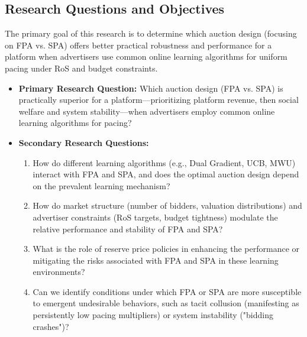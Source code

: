 \documentclass[12pt, a4paper]{article}
\begin{document}
\subsection{Research Questions and Objectives}
The primary goal of this research is to determine which auction design (focusing on FPA vs. SPA) offers better practical robustness and performance for a platform when advertisers use common online learning algorithms for uniform pacing under RoS and budget constraints.
\begin{itemize}
    \item \textbf{Primary Research Question:} Which auction design (FPA vs. SPA) is practically superior for a platform—prioritizing platform revenue, then social welfare and system stability—when advertisers employ common online learning algorithms for pacing?
    \item \textbf{Secondary Research Questions:}
        \begin{enumerate}
            \item How do different learning algorithms (e.g., Dual Gradient, UCB, MWU) interact with FPA and SPA, and does the optimal auction design depend on the prevalent learning mechanism?
            \item How do market structure (number of bidders, valuation distributions) and advertiser constraints (RoS targets, budget tightness) modulate the relative performance and stability of FPA and SPA?
            \item What is the role of reserve price policies in enhancing the performance or mitigating the risks associated with FPA and SPA in these learning environments?
            \item Can we identify conditions under which FPA or SPA are more susceptible to emergent undesirable behaviors, such as tacit collusion (manifesting as persistently low pacing multipliers) or system instability ("bidding crashes")?
        \end{enumerate}
\end{itemize}
\end{document}
